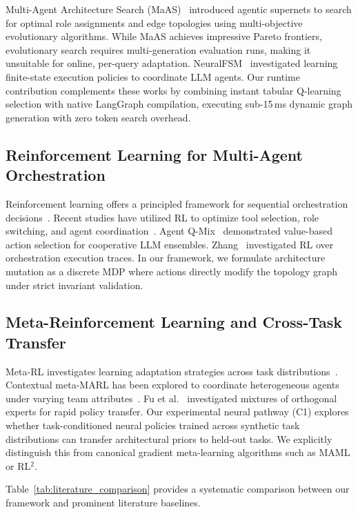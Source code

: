 \documentclass[conference]{IEEEtran}
\begin{document}
Multi-Agent Architecture Search (MaAS)~\cite{Zhang2025MaAS} introduced agentic supernets to search for optimal role assignments and edge topologies using multi-objective evolutionary algorithms. While MaAS achieves impressive Pareto frontiers, evolutionary search requires multi-generation evaluation runs, making it unsuitable for online, per-query adaptation. NeuralFSM~\cite{wang2026neuralfsm} investigated learning finite-state execution policies to coordinate LLM agents. Our runtime contribution complements these works by combining instant tabular Q-learning selection with native LangGraph compilation, executing sub-15\,ms dynamic graph generation with zero token search overhead.

\subsection{Reinforcement Learning for Multi-Agent Orchestration}
Reinforcement learning offers a principled framework for sequential orchestration decisions~\cite{li2020adaptive,wang2026spatial}. Recent studies have utilized RL to optimize tool selection, role switching, and agent coordination~\cite{qiu2025reinforcement,jiang2026agentqmix,rjoub2026aamc}. Agent Q-Mix~\cite{jiang2026agentqmix} demonstrated value-based action selection for cooperative LLM ensembles. Zhang~\cite{zhang2026orchestration} investigated RL over orchestration execution traces. In our framework, we formulate architecture mutation as a discrete MDP where actions directly modify the topology graph under strict invariant validation.

\subsection{Meta-Reinforcement Learning and Cross-Task Transfer}
Meta-RL investigates learning adaptation strategies across task distributions~\cite{Kashikar2025MetaRL,Huang2024AdaptiveMARL}. Contextual meta-MARL has been explored to coordinate heterogeneous agents under varying team attributes~\cite{Huang2024AdaptiveMARL}. Fu et al.~\cite{Fu2026MOFA} investigated mixtures of orthogonal experts for rapid policy transfer. Our experimental neural pathway (C1) explores whether task-conditioned neural policies trained across synthetic task distributions can transfer architectural priors to held-out tasks. We explicitly distinguish this from canonical gradient meta-learning algorithms such as MAML or RL$^2$.

Table~\ref{tab:literature_comparison} provides a systematic comparison between our framework and prominent literature baselines.
\end{document}
